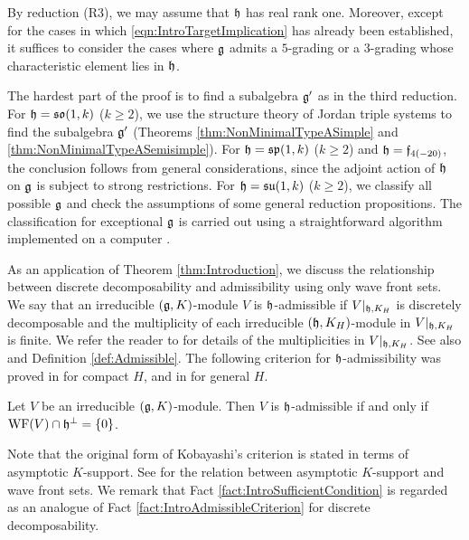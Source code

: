 By reduction (R3), we may assume that $\mathfrak{h}$ has real rank one.
Moreover, except for the cases in which \eqref{eqn:IntroTargetImplication} has already been established, it suffices to consider the cases where $\mathfrak{g}$ admits a $5$-grading or a $3$-grading whose characteristic element lies in $\mathfrak{h}$.

The hardest part of the proof is to find a subalgebra $\mathfrak{g}'$ as in the third reduction.
For $\mathfrak{h} = \mathfrak{so}(1, k)$ ($k \geq 2$), we use the structure theory of Jordan triple systems to find the subalgebra $\mathfrak{g}'$ (Theorems \ref{thm:NonMinimalTypeASimple} and \ref{thm:NonMinimalTypeASemisimple}).
For $\mathfrak{h} = \mathfrak{sp}(1, k)$ ($k \geq 2$) and $\mathfrak{h} = \mathfrak{f}_{4(-20)}$, the conclusion follows from general considerations, since the adjoint action of $\mathfrak{h}$ on $\mathfrak{g}$ is subject to strong restrictions.
For $\mathfrak{h} = \mathfrak{su}(1, k)$ ($k \geq 2$), we classify all possible $\mathfrak{g}$ and check the assumptions of some general reduction propositions.
The classification for exceptional $\mathfrak{g}$ is carried out using a straightforward algorithm implemented on a computer \cite{Ki26-code}.

As an application of Theorem \ref{thm:Introduction}, we discuss the relationship between discrete decomposability and admissibility using only wave front sets.
We say that an irreducible $(\mathfrak{g}, K)$-module $V$ is $\mathfrak{h}$-admissible if $V|_{\mathfrak{h}, K_H}$ is discretely decomposable and the multiplicity of each irreducible $(\mathfrak{h}, K_H)$-module in $V|_{\mathfrak{h}, K_H}$ is finite.
We refer the reader to \cite{Os25} for details of the multiplicities in $V|_{\mathfrak{h}, K_H}$.
See also \cite[Definition 16 and Proposition 16]{Ki24} and Definition \ref{def:Admissible}.
The following criterion for $\mathfrak{h}$-admissibility was proved in \cite{Ko98_discrete_decomposable_2, Ko19_admissible} for compact $H$, and in \cite{Ki24} for general $H$.


\begin{fact} \label{fact:IntroAdmissibleCriterion}
	Let $V$ be an irreducible $(\mathfrak{g}, K)$-module.
	Then $V$ is $\mathfrak{h}$-admissible if and only if $\mathrm{WF}(V)\cap \mathfrak{h}^\perp = \left\{0 \right\}$.
\end{fact}

Note that the original form of Kobayashi's criterion \cite{Ko98_discrete_decomposable_2} is stated in terms of asymptotic $K$-support.
See \cite[Corollary 9]{Ki24} for the relation between asymptotic $K$-support and wave front sets.
We remark that Fact \ref{fact:IntroSufficientCondition} is regarded as an analogue of Fact \ref{fact:IntroAdmissibleCriterion} for discrete decomposability.


